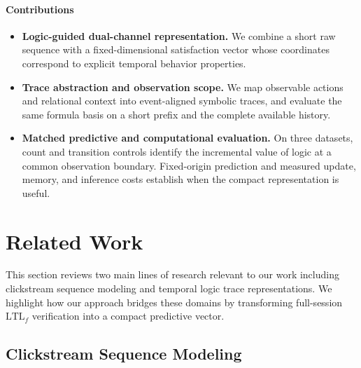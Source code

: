 \documentclass[sigconf,anonymous,nonacm]{acmart}
\newif\ifrevisions
\newcommand{\rev}[1]{\ifrevisions\textcolor{red}{#1}\else#1\fi}
\begin{document}
\paragraph{Contributions}
\begin{itemize}
  \item \rev{\textbf{Logic-guided dual-channel representation.} We combine a short raw sequence with a fixed-dimensional satisfaction vector whose coordinates correspond to explicit temporal behavior properties.}
  \item \rev{\textbf{Trace abstraction and observation scope.} We map observable actions and relational context into event-aligned symbolic traces, and evaluate the same formula basis on a short prefix and the complete available history.}
  \item \rev{\textbf{Matched predictive and computational evaluation.} On three datasets, count and transition controls identify the incremental value of logic at a common observation boundary. Fixed-origin prediction and measured update, memory, and inference costs establish when the compact representation is useful.}
\end{itemize}

\section{Related Work}\label{relatedwork}

This section reviews two main lines of research relevant to our work including clickstream sequence modeling and temporal logic trace representations. We highlight how our approach bridges these domains by transforming full-session $\mathrm{LTL}_f$ verification into a compact predictive vector.

\subsection{Clickstream Sequence Modeling}
\end{document}

